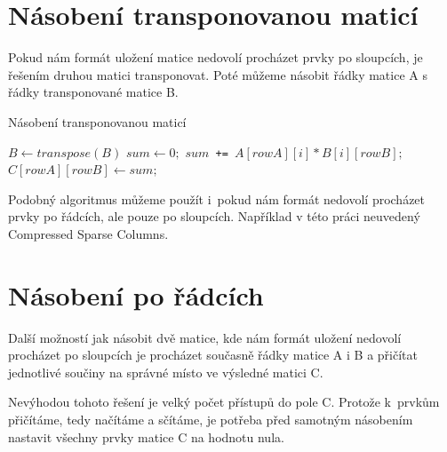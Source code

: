 
\section{Násobení transponovanou maticí}

Pokud nám formát uložení matice nedovolí procházet prvky po sloupcích, je řešením druhou matici transponovat. Poté můžeme násobit řádky matice A s řádky transponované matice B.

\begin{algorithm}[H]
	\caption{Násobení transponovanou maticí}\label{mmm-transpose}
	\begin{algorithmic}[1]
\State \texttt{$B \gets transpose(B)$}
		\State \texttt{$sum \gets 0;$}
			\State \texttt{$sum $ += $ A[rowA][i] * B[i][rowB];$}
		\EndFor
		\State \texttt{$C[rowA][rowB] \gets sum;$}
	\EndFor
\EndFor
		\EndProcedure
	\end{algorithmic}
\end{algorithm}

Podobný algoritmus můžeme použít i~pokud nám formát nedovolí procházet prvky po řádcích, ale pouze po sloupcích. Například v této práci neuvedený Compressed Sparse Columns.



\section{Násobení po řádcích}

Další možností jak násobit dvě matice, kde nám formát uložení nedovolí procházet po sloupcích je procházet současně řádky matice A i B a přičítat jednotlivé součiny na správné místo ve výsledné matici C.

Nevýhodou tohoto řešení je velký počet přístupů do pole C. Protože k~prvkům přičítáme, tedy načítáme a sčítáme, je potřeba před samotným násobením nastavit všechny prvky matice C na hodnotu nula.


